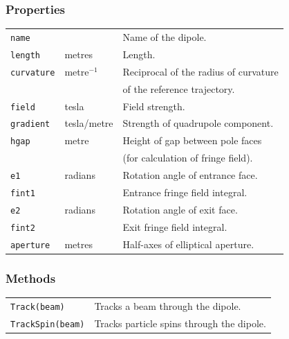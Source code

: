 \documentclass[11pt,twoside,a4paper]{article}
\begin{document}
\subsubsection{Properties}

\begin{tabular}{|l|l|l|}
\hline
\texttt{name} &              & Name of the dipole. \\
\texttt{length}          & metres       & Length.                     \\
\texttt{curvature}       & metre$^{-1}$ & Reciprocal of the radius of curvature \\
                         &              & of the reference trajectory. \\
\texttt{field}           & tesla        & Field strength.             \\
\texttt{gradient}        & tesla/metre  & Strength of quadrupole component. \\
\texttt{hgap}            & metre        & Height of gap between pole faces \\
                         &              & (for calculation of fringe field). \\
\texttt{e1}              & radians      & Rotation angle of entrance face. \\
\texttt{fint1}           &              & Entrance fringe field integral. \\
\texttt{e2}              & radians      & Rotation angle of exit face. \\
\texttt{fint2}           &              & Exit fringe field integral. \\
\texttt{aperture} & metres & Half-axes of elliptical aperture. \\
\hline
\end{tabular}
\vspace{0.2in}

\subsubsection{Methods}

\begin{tabular}{|l|l|}
\hline
\texttt{Track(beam)} & Tracks a beam through the dipole. \\
\texttt{TrackSpin(beam)} & Tracks particle spins through the dipole. \\
\hline
\end{tabular}
\vspace{0.2in}
\end{document}
